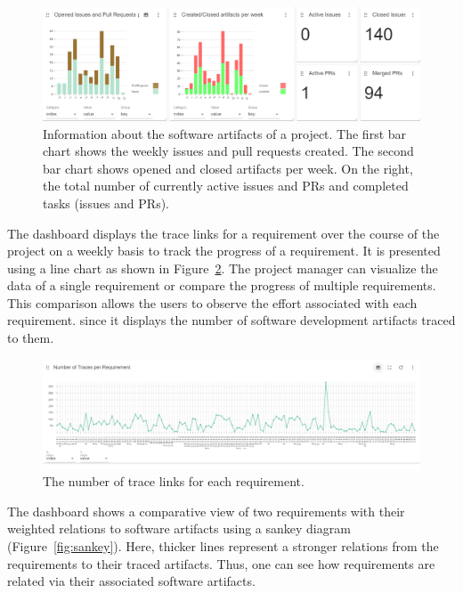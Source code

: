 \begin{figure}[hbt]
    \centering
    \includegraphics[width=.9\linewidth]{figs/dashboard-barcharts.png}
    \caption{Information about the software artifacts of a project. The first bar chart shows the weekly issues and pull requests created. The second bar chart shows opened and closed artifacts per week.  On the right, the total number of currently active issues and PRs and completed tasks (issues and PRs). }
    \label{fig:barcharts}
\end{figure}

The dashboard displays the trace links for a requirement over the course of the project on a weekly basis to track the progress of a requirement.
It is presented using a line chart as shown in Figure~\ref{fig:linechart}. 
The project manager can visualize the data of a single requirement or compare the progress of multiple requirements. %
This comparison allows the users to observe the effort associated with each requirement.%
since it displays the number of software development artifacts traced to them.

\begin{figure}[htb]
    \centering
    \includegraphics[width=.9\linewidth]{figs/linechart.png}
    \caption{The number of trace links for each requirement. }
    \label{fig:linechart}
\end{figure}

The dashboard shows a comparative  view of two requirements with their weighted relations to software artifacts using  a sankey diagram (Figure~\ref{fig:sankey}). %
Here, thicker lines represent a stronger relations from the requirements to their traced artifacts. 
Thus, one can see how requirements are related via their associated software artifacts.

